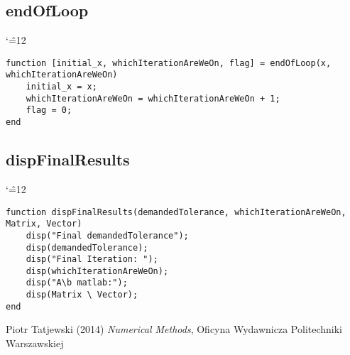 \documentclass{report}
\newenvironment{simplechar}{%
   \catcode`\^=12
}{}
\begin{document}
\subsection{endOfLoop}
\begin{simplechar}
\begin{lstlisting}
function [initial_x, whichIterationAreWeOn, flag] = endOfLoop(x, whichIterationAreWeOn)
    initial_x = x;
    whichIterationAreWeOn = whichIterationAreWeOn + 1;
    flag = 0;
end
\end{lstlisting}
\end{simplechar}

\subsection{dispFinalResults}
\begin{simplechar}
\begin{lstlisting}
function dispFinalResults(demandedTolerance, whichIterationAreWeOn, Matrix, Vector)
    disp("Final demandedTolerance");
    disp(demandedTolerance);
    disp("Final Iteration: ");
    disp(whichIterationAreWeOn);
    disp("A\b matlab:");
    disp(Matrix \ Vector);
end
\end{lstlisting}
\end{simplechar}

\begin{thebibliography}{9}
Piotr Tatjewski (2014) \emph{Numerical Methods}, Oficyna Wydawnicza Politechniki Warszawskiej
\end{thebibliography}
\end{document}
